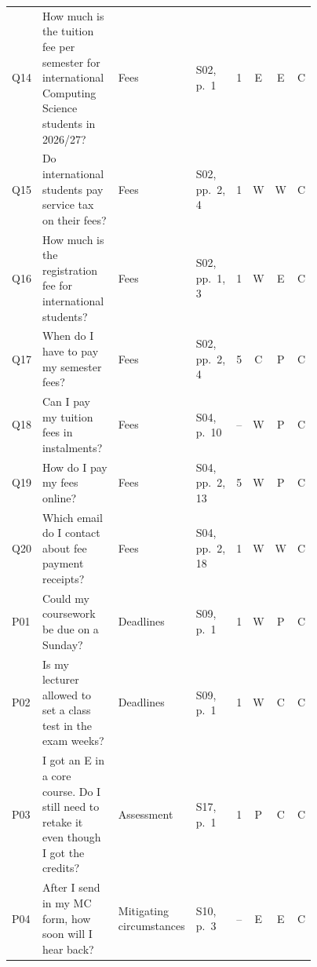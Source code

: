 \begin{minipage}{15.29cm}
\begin{tabular}{L{0.05\linewidth}L{0.45\linewidth}L{0.15\linewidth}L{0.12\linewidth}cccc}
Q14 & How much is the tuition fee per semester for international Computing Science students in 2026/27? & Fees & S02, p.~1 & 1 & E & E & C \\
Q15 & Do international students pay service tax on their fees? & Fees & S02, pp.~2, 4 & 1 & W & W & C \\
Q16 & How much is the registration fee for international students? & Fees & S02, pp.~1, 3 & 1 & W & E & C \\
Q17 & When do I have to pay my semester fees? & Fees & S02, pp.~2, 4 & 5 & C & P & C \\
Q18 & Can I pay my tuition fees in instalments? & Fees & S04, p.~10 & -- & W & P & C \\
Q19 & How do I pay my fees online? & Fees & S04, pp.~2, 13 & 5 & W & P & C \\
Q20 & Which email do I contact about fee payment receipts? & Fees & S04, pp.~2, 18 & 1 & W & W & C \\
P01 & Could my coursework be due on a Sunday? & Deadlines & S09, p.~1 & 1 & W & P & C \\
P02 & Is my lecturer allowed to set a class test in the exam weeks? & Deadlines & S09, p.~1 & 1 & W & C & C \\
P03 & I got an E in a core course. Do I still need to retake it even though I got the credits? & Assessment & S17, p.~1 & 1 & P & C & C \\
P04 & After I send in my MC form, how soon will I hear back? & Mitigating circumstances & S10, p.~3 & -- & E & E & C \\
\bottomrule
\end{tabular}
\end{minipage}
